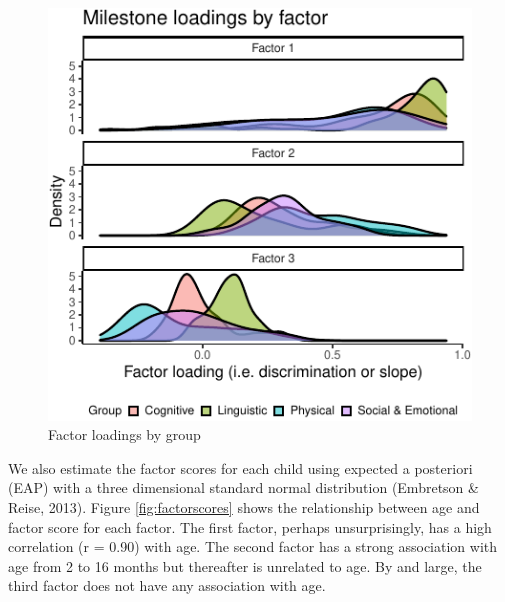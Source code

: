 \documentclass[10pt, letterpaper]{article}
\newenvironment{CodeChunk}{}{}
\begin{document}
\begin{CodeChunk}
\begin{figure}[tb]
\includegraphics{figs/factorloadings-1} \caption[Factor loadings by group]{Factor loadings by group}\label{fig:factorloadings}
\end{figure}
\end{CodeChunk}

We also estimate the factor scores for each child using expected a
posteriori (EAP) with a three dimensional standard normal distribution
(Embretson \& Reise, 2013). Figure \ref{fig:factorscores} shows the
relationship between age and factor score for each factor. The first
factor, perhaps unsurprisingly, has a high correlation (r = 0.90) with
age. The second factor has a strong association with age from 2 to 16
months but thereafter is unrelated to age. By and large, the third
factor does not have any association with age.
\end{document}

